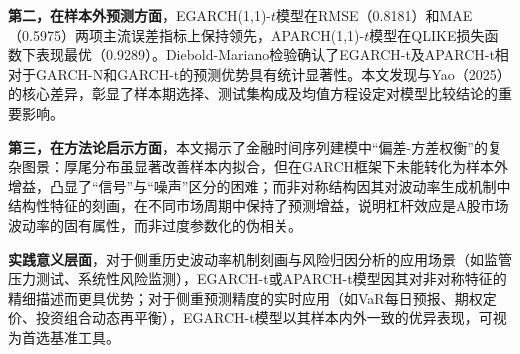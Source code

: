 \documentclass[12pt,a4paper]{ctexart}
\begin{document}
\textbf{第二，在样本外预测方面}，EGARCH(1,1)-$t$模型在RMSE（0.8181）和MAE（0.5975）两项主流误差指标上保持领先，APARCH(1,1)-$t$模型在QLIKE损失函数下表现最优（0.9289）。Diebold-Mariano检验确认了EGARCH-t及APARCH-t相对于GARCH-N和GARCH-t的预测优势具有统计显著性。本文发现与Yao（2025）的核心差异，彰显了样本期选择、测试集构成及均值方程设定对模型比较结论的重要影响。

\textbf{第三，在方法论启示方面}，本文揭示了金融时间序列建模中“偏差-方差权衡”的复杂图景：厚尾分布虽显著改善样本内拟合，但在GARCH框架下未能转化为样本外增益，凸显了“信号”与“噪声”区分的困难；而非对称结构因其对波动率生成机制中结构性特征的刻画，在不同市场周期中保持了预测增益，说明杠杆效应是A股市场波动率的固有属性，而非过度参数化的伪相关。

\textbf{实践意义层面}，对于侧重历史波动率机制刻画与风险归因分析的应用场景（如监管压力测试、系统性风险监测），EGARCH-t或APARCH-t模型因其对非对称特征的精细描述而更具优势；对于侧重预测精度的实时应用（如VaR每日预报、期权定价、投资组合动态再平衡），EGARCH-t模型以其样本内外一致的优异表现，可视为首选基准工具。

\newpage
\end{document}
